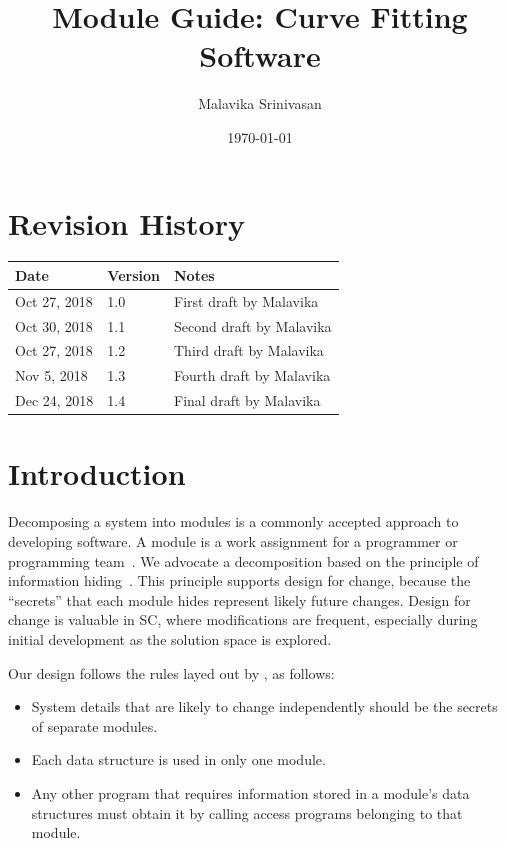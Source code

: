 \documentclass[12pt, titlepage]{article}
\begin{document}
\title{Module Guide: Curve Fitting Software} 
\author{Malavika Srinivasan}
\date{\today}

\maketitle


\section{Revision History}

\begin{tabularx}{\textwidth}{p{3cm}p{2cm}X}
\toprule {\bf Date} & {\bf Version} & {\bf Notes}\\
\midrule
Oct 27, 2018 & 1.0 & First draft by Malavika\\
Oct 30, 2018 & 1.1 & Second draft by Malavika\\
Oct 27, 2018 & 1.2 & Third draft by Malavika\\
Nov 5, 2018 & 1.3 & Fourth draft by Malavika\\
Dec 24, 2018 & 1.4 & Final draft by Malavika\\
\bottomrule
\end{tabularx}

\newpage

\tableofcontents

\listoftables

\listoffigures

\newpage


\section{Introduction}

Decomposing a system into modules is a commonly accepted approach to developing
software.  A module is a work assignment for a programmer or programming
team~\citep{ParnasEtAl1984}.  We advocate a decomposition
based on the principle of information hiding~\citep{Parnas1972a}.  This
principle supports design for change, because the ``secrets'' that each module
hides represent likely future changes.  Design for change is valuable in SC,
where modifications are frequent, especially during initial development as the
solution space is explored.  

Our design follows the rules layed out by \citet{ParnasEtAl1984}, as follows:
\begin{itemize}
\item System details that are likely to change independently should be the
  secrets of separate modules.
\item Each data structure is used in only one module.
\item Any other program that requires information stored in a module's data
  structures must obtain it by calling access programs belonging to that module.
\end{itemize}
\end{document}
